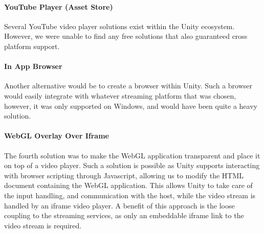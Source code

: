 \paragraph{YouTube Player (Asset Store)}
Several YouTube video player solutions exist within the Unity ecosystem. However, we were unable to find any free solutions that also guaranteed cross platform support. 

\paragraph{In App Browser}
Another alternative would be to create a browser within Unity\cite{unity_simple_browser}. Such a browser would easily integrate with whatever streaming platform that was chosen, however, it was only supported on Windows, and would have been quite a heavy solution.

\paragraph{WebGL Overlay Over Iframe}
The fourth solution was to make the WebGL application transparent and place it on top of a video player. Such a solution is possible as Unity supports interacting with browser scripting through Javascript\cite{unity_webgl_javascript_interaction}, allowing us to modify the HTML document containing the WebGL application. 
This allows Unity to take care of the input handling, and communication with the host, while the video stream is handled by an iframe video player. A benefit of this approach is the loose coupling to the streaming services, as only an embeddable iframe link to the video stream is required.

    

